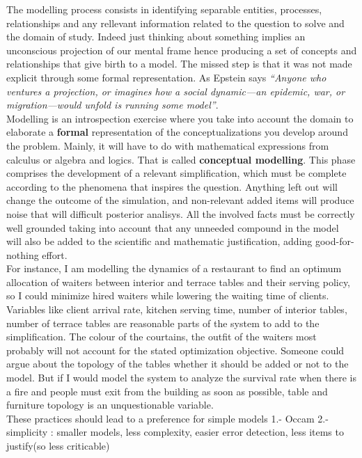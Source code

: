 \documentclass{report}
\begin{document}
The modelling process consists in identifying separable entities, processes, relationships and any rellevant information related to the question to solve and the domain of study. Indeed just thinking about something implies an unconscious projection of our mental frame hence producing a set of concepts and relationships that give birth to a model. The missed step is that it was not made explicit through some formal representation.
As Epstein \cite{Epstein2008} says \textit{“Anyone who ventures a projection, or imagines how a social dynamic—an epidemic, war, or migration—would unfold is running some model”}.\\
Modelling is an introspection exercise where you take into account the domain to elaborate a \textbf{formal} representation of the conceptualizations you develop around the problem. Mainly, it will have to do with mathematical expressions from calculus or algebra and logics. That is called \textbf{conceptual modelling}. This phase comprises the development of a relevant simplification, which must be complete according to the phenomena that inspires the question. Anything left out will change the outcome of the simulation, and non-relevant added items will produce noise that will difficult posterior analisys. All the involved facts must be correctly well grounded taking into account that any unneeded compound in the model will also be added to the scientific and mathematic justification, adding good-for-nothing effort. \\
For instance, I am modelling the dynamics of a restaurant to find an optimum allocation of waiters between interior and terrace tables and their serving policy, so I could minimize hired waiters while lowering the waiting time of clients. Variables like client arrival rate, kitchen serving time, number of interior tables, number of terrace tables are reasonable parts of the system to add to the simplification. The colour of the courtains, the outfit of the waiters most probably will not account for the stated optimization objective. Someone could argue about the topology of the tables whether it should be added or not to the model. But if I would model the system to analyze the survival rate when there is a fire and people must exit from the building as soon as possible, table and furniture topology is an unquestionable variable.\\

These practices should lead to a preference for simple models
1.- Occam
2.- simplicity : smaller models, less complexity, easier error detection, less items to justify(so less criticable)
\end{document}
